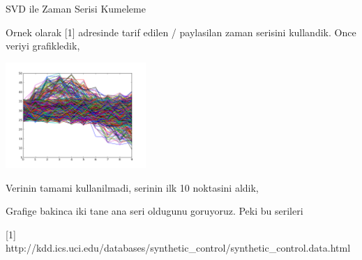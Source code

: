 \documentclass[12pt,fleqn]{article}\usepackage{../common}
\begin{document}
SVD ile Zaman Serisi Kumeleme

Ornek olarak [1] adresinde tarif edilen / paylasilan zaman serisini
kullandik. Once veriyi grafikledik, 

\includegraphics[height=4cm]{data.png}

Verinin tamami kullanilmadi, serinin ilk 10 noktasini aldik, 



Grafige bakinca iki tane ana seri oldugunu goruyoruz. Peki bu serileri 

[1] http://kdd.ics.uci.edu/databases/synthetic\_control/synthetic\_control.data.html
\end{document}
